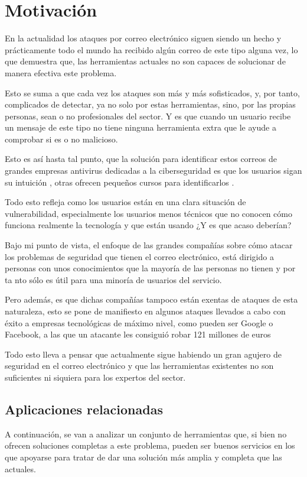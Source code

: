 \chapter{Motivación}
En la actualidad los ataques por correo electrónico siguen siendo un hecho y prácticamente todo el mundo ha recibido algún correo de este tipo alguna vez, lo que demuestra que, las herramientas actuales no son capaces de solucionar de manera efectiva este problema. 

Esto se suma a que cada vez los ataques son más y más sofisticados, y, por tanto, complicados de detectar, ya no solo por estas herramientas, sino, por las propias personas, sean o no profesionales del sector. Y es que cuando un usuario recibe un mensaje de este tipo no tiene ninguna herramienta extra que le ayude a comprobar si es o no malicioso. 

Esto es así hasta tal punto, que la solución para identificar estos correos de grandes empresas antivirus dedicadas a la ciberseguridad es que los usuarios sigan su intuición \cite{What_is_phishing}, otras ofrecen pequeños cursos para identificarlos \cite{Google_juego}.

Todo esto refleja como los usuarios están en una clara situación de vulnerabilidad, especialmente los usuarios menos técnicos que no conocen cómo funciona realmente la tecnología y que están usando ¿Y es que acaso deberían?

Bajo mi punto de vista, el enfoque de las grandes compañías sobre cómo atacar los problemas de seguridad que tienen el correo electrónico, está dirigido a personas con unos conocimientos que la mayoría de las personas no tienen y por ta nto sólo es útil para una minoría de usuarios del servicio. 

Pero además, es que dichas compañías tampoco están exentas de ataques de esta naturaleza, esto se pone de manifiesto en algunos ataques llevados a cabo con éxito a empresas tecnológicas de máximo nivel, como pueden ser Google o Facebook, a las que un atacante les consiguió robar 121 millones de euros \cite{estafa_google_facebook}

Todo esto lleva a pensar que actualmente sigue habiendo un gran agujero de seguridad en el correo electrónico y que las herramientas existentes no son suficientes ni siquiera para los expertos del sector. 



\section{Aplicaciones relacionadas}
A continuación, se van a analizar un conjunto de herramientas que, si bien no ofrecen soluciones completas a este problema, pueden ser buenos servicios en los que apoyarse para tratar de dar una solución más amplia y completa que las actuales.
